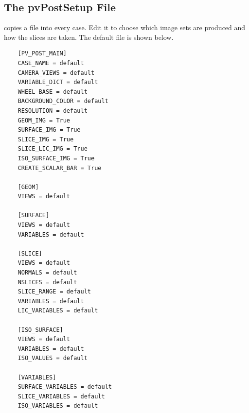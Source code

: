 \subsection{The pvPostSetup File}
 copies a  file into every case. Edit it to choose which image sets are produced and how the slices are taken. The default file is shown below.
\begin{lstlisting}
    [PV_POST_MAIN]
    CASE_NAME = default
    CAMERA_VIEWS = default
    VARIABLE_DICT = default
    WHEEL_BASE = default
    BACKGROUND_COLOR = default
    RESOLUTION = default
    GEOM_IMG = True
    SURFACE_IMG = True
    SLICE_IMG = True
    SLICE_LIC_IMG = True
    ISO_SURFACE_IMG = True
    CREATE_SCALAR_BAR = True

    [GEOM]
    VIEWS = default

    [SURFACE]
    VIEWS = default
    VARIABLES = default

    [SLICE]
    VIEWS = default
    NORMALS = default
    NSLICES = default
    SLICE_RANGE = default
    VARIABLES = default
    LIC_VARIABLES = default

    [ISO_SURFACE]
    VIEWS = default
    VARIABLES = default
    ISO_VALUES = default

    [VARIABLES]
    SURFACE_VARIABLES = default
    SLICE_VARIABLES = default
    ISO_VARIABLES = default
\end{lstlisting}

